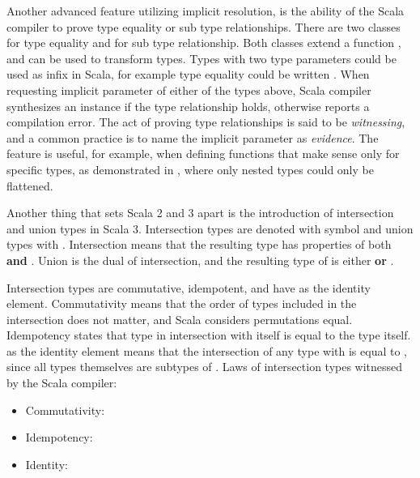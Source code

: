 Another advanced feature utilizing implicit resolution, is the ability of the Scala compiler to prove type equality or sub type relationships. There are two classes \inlinescala{=:=[From, To]} for type equality and \inlinescala{<:<[From, To]} for sub type relationship. Both classes extend a function , and can be used to transform types. Types with two type parameters could be used as infix in Scala, for example type equality could be written . When requesting implicit parameter of either of the types above, Scala compiler synthesizes an instance if the type relationship holds, otherwise reports a compilation error. The act of proving type relationships is said to be \textit{witnessing}, and a common practice is to name the implicit parameter as \textit{evidence}. The feature is useful, for example, when defining functions that make sense only for specific types, as demonstrated in , where only nested  types could only be flattened.



Another thing that sets Scala 2 and 3 apart is the introduction of intersection and union types in Scala 3. Intersection types are denoted with \inlinecode{&} symbol and union types with \inlinecode{|}. Intersection  means that the resulting type has properties of both  \textbf{and} . Union is the dual of intersection, and the resulting type of  is either  \textbf{or} .

Intersection types are commutative, idempotent, and have  as the identity element. Commutativity means that the order of types included in the intersection does not matter, and Scala considers permutations equal. Idempotency states that type in intersection with itself is equal to the type itself.  as the identity element means that the intersection of any type  with  is equal to , since all types themselves are subtypes of . Laws of intersection types witnessed by the Scala compiler:
\begin{itemize}
    \item Commutativity: 
    \item Idempotency: 
    \item Identity: 
\end{itemize}


